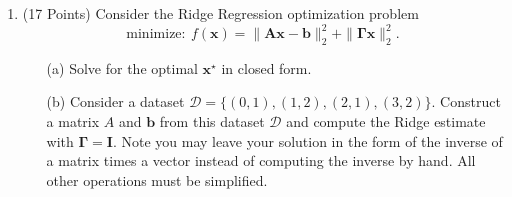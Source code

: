 \documentclass[letter, 12pt]{article}
\begin{document}
\begin{enumerate}
\item (17 Points) Consider the Ridge Regression optimization problem
    \[
        \mathrm{minimize:}~f(\mathbf{x}) = \|\mathbf{A}\mathbf{x} - \mathbf{b}\|_2^2 + \|\mathbf{\Gamma}\mathbf{x}\|_2^2.
    \]
    \begin{enumerate}
        \item[(a)] Solve for the optimal $\mathbf{x}^\star$ in closed form.\vfill
        \item[(b)] Consider a dataset $\mathcal{D} = \{(0,1), (1,2),(2,1),(3,2)\}$.
            Construct a matrix $A$ and $\mathbf{b}$ from this dataset $\mathcal{D}$ and
            compute the Ridge estimate with $\mathbf{\Gamma} = \mathbf{I}$. Note you
            may leave your solution in the form of the inverse of a matrix times a
            vector instead of computing the inverse by hand. All other operations must
            be simplified.\vfill
    \end{enumerate}
    \clearpage


\end{enumerate}
\end{document}
